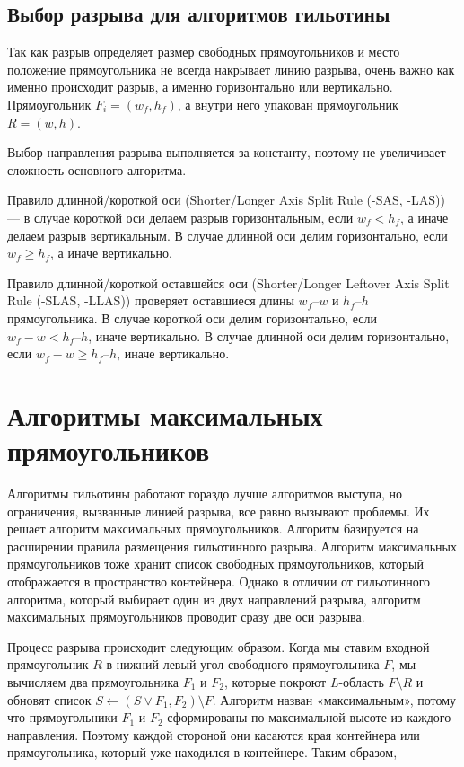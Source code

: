 \documentclass[a4paper,12pt]{report}
\theoremstyle{remark}
\begin{document}
\subsection{Выбор разрыва для алгоритмов гильотины}

Так как разрыв определяет размер свободных прямоугольников и место положение прямоугольника не всегда накрывает линию разрыва, очень важно как именно происходит разрыв, а именно горизонтально или вертикально. Прямоугольник $F_i = (w_f, h_f)$, а внутри него упакован прямоугольник $R = (w, h)$.

Выбор направления разрыва выполняется за константу, поэтому не увеличивает сложность основного алгоритма. 

Правило длинной/короткой оси (Shorter/Longer Axis Split Rule (-SAS, -LAS)) — в случае короткой оси делаем разрыв горизонтальным, если $w_f < h_f$, а иначе делаем разрыв вертикальным. В случае длинной оси делим горизонтально, если $w_f \geq h_f$, а иначе вертикально.

Правило длинной/короткой оставшейся оси (Shorter/Longer Leftover Axis Split Rule (-SLAS, -LLAS)) проверяет оставшиеся длины $w_f – w$ и $h_f – h$ прямоугольника. В случае короткой оси делим горизонтально, если $w_f - w < h_f – h$, иначе вертикально. В случае длинной оси делим горизонтально, если  $w_f - w \geq h_f – h$, иначе вертикально.


\section{Алгоритмы максимальных прямоугольников}

Алгоритмы гильотины работают гораздо лучше алгоритмов выступа, но ограничения, вызванные линией разрыва, все равно вызывают проблемы. Их решает алгоритм максимальных прямоугольников. Алгоритм базируется на расширении правила размещения гильотинного разрыва. Алгоритм максимальных прямоугольников тоже хранит список свободных прямоугольников, который отображается в пространство контейнера. Однако в отличии от гильотинного алгоритма, который выбирает один из двух направлений разрыва, алгоритм максимальных прямоугольников проводит сразу две оси разрыва\citep{Jylanki}.

Процесс разрыва происходит следующим образом. Когда мы ставим входной прямоугольник $R$ в нижний левый угол свободного прямоугольника $F$, мы вычисляем два прямоугольника $F_1$ и $F_2$, которые покроют $L$-область $F\setminus R$ и обновят список $S \leftarrow (S \vee {F_1, F_2}) \setminus {F}$. Алгоритм назван «максимальным», потому что прямоугольники $F_1$ и $F_2$ сформированы по максимальной высоте из каждого направления. Поэтому каждой стороной они касаются края контейнера или прямоугольника, который уже находился в контейнере. Таким образом,
\end{document}
